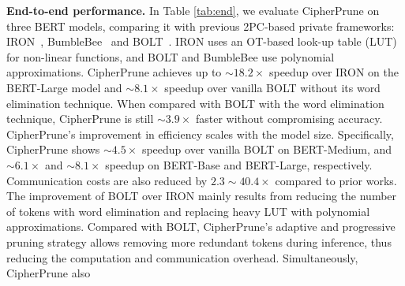 \noindent\textbf{End-to-end performance.}
In Table \ref{tab:end}, we evaluate CipherPrune on three BERT models, comparing it with previous 2PC-based private frameworks: IRON~\citep{hao2022iron-iron}, BumbleBee~\citep{lu2023bumblebee} and BOLT~\citep{pang2023bolt}. IRON uses an OT-based look-up table (LUT) for non-linear functions, and BOLT and BumbleBee use polynomial approximations. CipherPrune achieves up to $\sim18.2\times$ speedup over IRON on the BERT-Large model and $\sim8.1\times$ speedup over vanilla BOLT without its word elimination technique. When compared with BOLT with the word elimination technique, CipherPrune is still $\sim3.9\times$ faster without compromising accuracy. CipherPrune's improvement in efficiency scales with the model size.  Specifically, CipherPrune shows $\sim4.5\times$ speedup over vanilla BOLT on BERT-Medium, and $\sim6.1\times$ and $\sim 8.1 \times$ speedup on BERT-Base and BERT-Large, respectively. Communication costs are also reduced by $2.3\sim40.4\times$ compared to prior works. The improvement of BOLT over IRON mainly results from reducing the number of tokens with word elimination and replacing heavy LUT with polynomial approximations. Compared with BOLT, CipherPrune's adaptive and progressive pruning strategy allows removing more redundant tokens during inference, thus reducing the computation and communication overhead. Simultaneously, CipherPrune also 



